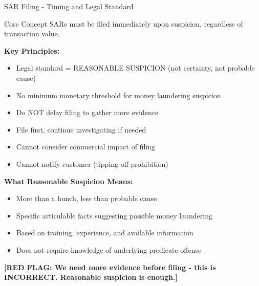\documentclass[11pt,a4paper]{beamer}
\newcommand{\redflag}[1]{\textcolor{red!80!black}{\textbf{[RED FLAG: #1]}}}
\begin{document}
	\begin{frame}{SAR Filing - Timing and Legal Standard}
		\begin{block}{Core Concept}
			SARs must be filed immediately upon suspicion, regardless of transaction value.
		\end{block}
		\textbf{Key Principles:}
		\begin{itemize}
			\item Legal standard = REASONABLE SUSPICION (not certainty, not probable cause)
			\item No minimum monetary threshold for money laundering suspicion
			\item Do NOT delay filing to gather more evidence
			\item File first, continue investigating if needed
			\item Cannot consider commercial impact of filing
			\item Cannot notify customer (tipping-off prohibition)
		\end{itemize}
		\textbf{What Reasonable Suspicion Means:}
		\begin{itemize}
			\item More than a hunch, less than probable cause
			\item Specific articulable facts suggesting possible money laundering
			\item Based on training, experience, and available information
			\item Does not require knowledge of underlying predicate offense
		\end{itemize}
		\redflag{We need more evidence before filing - this is INCORRECT. Reasonable suspicion is enough.}
	\end{frame}
	
\end{document}
